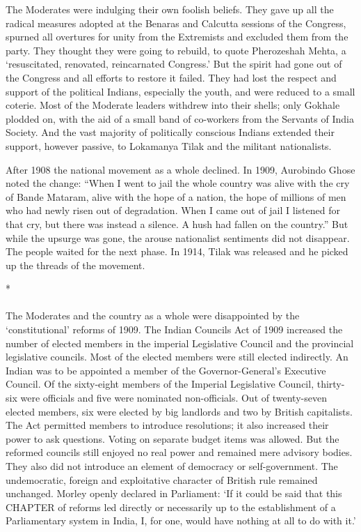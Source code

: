 The Moderates were indulging their own foolish beliefs. They gave up all the radical measures adopted at the Benaras and Calcutta sessions of the Congress, spurned all overtures for unity from the Extremists and excluded them from the party. They thought they were going to rebuild, to quote Pherozeshah Mehta, a `resuscitated, renovated, reincarnated Congress.' But the spirit had gone out of the Congress and all efforts to restore it failed. They had lost the respect and support of the political Indians, especially the youth, and were reduced to a small coterie. Most of the Moderate leaders withdrew into their shells; only Gokhale plodded on, with the aid of a small band of co-workers from the Servants of India Society. And the vast majority of politically conscious Indians extended their support, however passive, to Lokamanya Tilak and the militant nationalists.

After 1908 the national movement as a whole declined. In 1909, Aurobindo Ghose noted the change: ``When I went to jail the whole country was alive with the cry of Bande Mataram, alive with the hope of a nation, the hope of millions of men who had newly risen out of degradation. When I came out of jail I listened for that cry, but there was instead a silence. A hush had fallen on the country.'' But while the upsurge was gone, the arouse nationalist sentiments did not disappear. The people waited for the next phase. In 1914, Tilak was released and he picked up the threads of the movement.

\begin{center}*\end{center}

\paragraph*{}

The Moderates and the country as a whole were disappointed by the `constitutional' reforms of 1909. The Indian Councils Act of 1909 increased the number of elected members in the imperial Legislative Council and the provincial legislative councils. Most of the elected members were still elected indirectly. An Indian was to be appointed a member of the Governor-General's Executive Council. Of the sixty-eight members of the Imperial Legislative Council, thirty-six were officials and five were nominated non-officials. Out of twenty-seven elected members, six were elected by big landlords and two by British capitalists. The Act permitted members to introduce resolutions; it also increased their power to ask questions. Voting on separate budget items was allowed. But the reformed councils still enjoyed no real power and remained mere advisory bodies. They also did not introduce an element of democracy or self-government. The undemocratic, foreign and exploitative character of British rule remained unchanged. Morley openly declared in Parliament: `If it could be said that this CHAPTER of reforms led directly or necessarily up to the establishment of a Parliamentary system in India, I, for one, would have nothing at all to do with it.'

